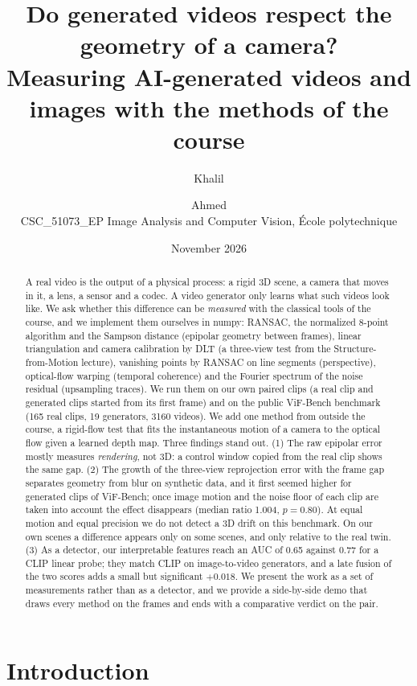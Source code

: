 \documentclass[11pt,a4paper]{article}
\title{Do generated videos respect the geometry of a camera?\\[4pt]
\large Measuring AI-generated videos and images with the methods of the course}
\author{Khalil \and Ahmed\\[2pt]
\small CSC\_51073\_EP Image Analysis and Computer Vision, \'Ecole polytechnique}
\date{November 2026}
\begin{document}
\maketitle

\begin{abstract}
A real video is the output of a physical process: a rigid 3D scene, a camera that moves in
it, a lens, a sensor and a codec. A video generator only learns what such videos look like.
We ask whether this difference can be \emph{measured} with the classical tools of the course,
and we implement them ourselves in numpy: RANSAC, the normalized 8-point algorithm and the
Sampson distance (epipolar geometry between frames), linear triangulation and camera
calibration by DLT (a three-view test from the Structure-from-Motion lecture), vanishing
points by RANSAC on line segments (perspective), optical-flow warping (temporal coherence)
and the Fourier spectrum of the noise residual (upsampling traces). We run them on our own
paired clips (a real clip and generated clips started from its first frame) and on the
public ViF-Bench benchmark (165 real clips, 19 generators, 3160 videos). We add one method
from outside the course, a rigid-flow test that fits the instantaneous motion of a camera to
the optical flow given a learned depth map. Three findings stand out. (1) The raw epipolar
error mostly measures \emph{rendering}, not 3D: a control window copied from the real clip
shows the same gap. (2) The growth of the three-view reprojection error with the frame gap
separates geometry from blur on synthetic data, and it first seemed higher for generated
clips of ViF-Bench; once image motion and the noise floor of each clip are taken into account
the effect disappears (median ratio 1.004, $p=0.80$). At equal motion and equal precision we
do not detect a 3D drift on this benchmark. On our own scenes a difference appears only on
some scenes, and only relative to the real twin. (3) As a detector, our interpretable
features reach an AUC of 0.65 against 0.77 for a CLIP linear probe; they match CLIP on
image-to-video generators, and a late fusion of the two scores adds a small but significant
$+0.018$. We present the work as a set of measurements rather than as a detector, and we
provide a side-by-side demo that draws every method on the frames and ends with a
comparative verdict on the pair.
\end{abstract}

\section{Introduction}
\end{document}
